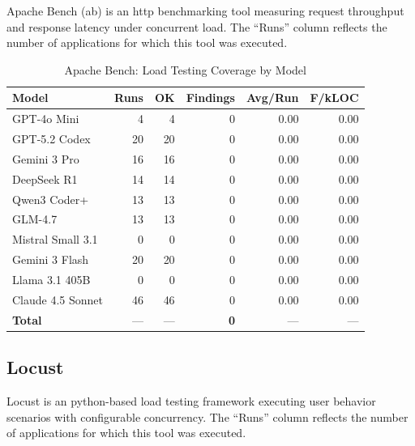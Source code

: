 Apache Bench (ab) is an http benchmarking tool measuring request throughput and response latency under concurrent load. The ``Runs'' column reflects the number of applications for which this tool was executed.

\begin{table}[htbp]
    \centering
    \caption{Apache Bench: Load Testing Coverage by Model}
    \label{tab:tool_ab}
    \small
    \begin{tabular}{@{} l r r r r r @{}}
        \toprule
        \textbf{Model} & \textbf{Runs} & \textbf{OK} & \textbf{Findings} & \textbf{Avg/Run} & \textbf{F/kLOC} \\
        \midrule
        GPT-4o Mini & 4 & 4 & 0 & 0.00 & 0.00 \\
        GPT-5.2 Codex & 20 & 20 & 0 & 0.00 & 0.00 \\
        Gemini 3 Pro & 16 & 16 & 0 & 0.00 & 0.00 \\
        DeepSeek R1 & 14 & 14 & 0 & 0.00 & 0.00 \\
        Qwen3 Coder+ & 13 & 13 & 0 & 0.00 & 0.00 \\
        GLM-4.7 & 13 & 13 & 0 & 0.00 & 0.00 \\
        Mistral Small 3.1 & 0 & 0 & 0 & 0.00 & 0.00 \\
        Gemini 3 Flash & 20 & 20 & 0 & 0.00 & 0.00 \\
        Llama 3.1 405B & 0 & 0 & 0 & 0.00 & 0.00 \\
        Claude 4.5 Sonnet & 46 & 46 & 0 & 0.00 & 0.00 \\
        \midrule
        \textbf{Total} & --- & --- & \textbf{0} & --- & --- \\
        \bottomrule
    \end{tabular}
\end{table}

\subsection{Locust}

Locust is an python-based load testing framework executing user behavior scenarios with configurable concurrency. The ``Runs'' column reflects the number of applications for which this tool was executed.

